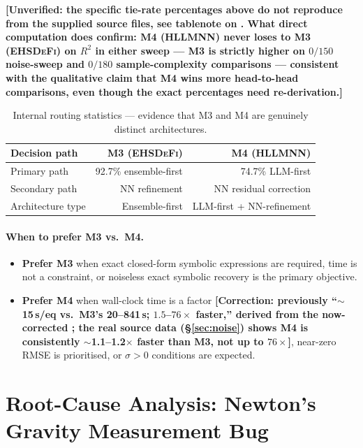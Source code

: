 \documentclass[twoside,11pt]{article}
\newcommand{\EHD}{\textsc{EHSDeFi}}
\newcommand{\HSL}{\textsc{HLLMNN}}
\newcommand{\Rsq}{R^{2}}
\begin{document}
\textbf{[Unverified: the specific tie-rate percentages above do not
reproduce from the supplied source files, see tablenote on
. What direct computation does confirm: M4 (\HSL)
never loses to M3 (\EHD) on $\Rsq$ in either sweep --- M3 is strictly
higher on $0/150$ noise-sweep and $0/180$ sample-complexity comparisons
--- consistent with the qualitative claim that M4 wins more head-to-head
comparisons, even though the exact percentages need re-derivation.]}

\begin{table}[H]
\centering
\caption{Internal routing statistics — evidence that M3 and M4 are genuinely
         distinct architectures.}
\label{tab:arch}
\small
\begin{tabular}{L{3.5cm} r r}
\toprule
\textbf{Decision path} & \textbf{M3 (\EHD)} & \textbf{M4 (\HSL)}\\
\midrule
Primary path    & 92.7\% ensemble-first  & 74.7\% LLM-first\\
Secondary path  & NN refinement          & NN residual correction\\
Architecture type & Ensemble-first       & LLM-first + NN-refinement\\
\bottomrule
\end{tabular}
\end{table}

\paragraph{When to prefer M3 vs.\ M4.}
\begin{itemize}
\item \textbf{Prefer M3} when exact closed-form symbolic expressions are
  required, time is not a constraint, or noiseless exact symbolic recovery
  is the primary objective.
\item \textbf{Prefer M4} when wall-clock time is a factor
  \textbf{[Correction: previously ``$\sim$15\,s/eq vs.\ M3's 20--841\,s;
  $1.5$--$76\times$ faster,'' derived from the now-corrected
  ; the real source data (\S\ref{sec:noise}) shows M4
  is consistently $\sim$1.1--1.2$\times$ faster than M3, not up to
  $76\times$]}, near-zero RMSE is prioritised, or $\sigma>0$ conditions are
  expected.
\end{itemize}

\section{Root-Cause Analysis: Newton's Gravity Measurement Bug}
\label{sec:bugfix}
\end{document}
